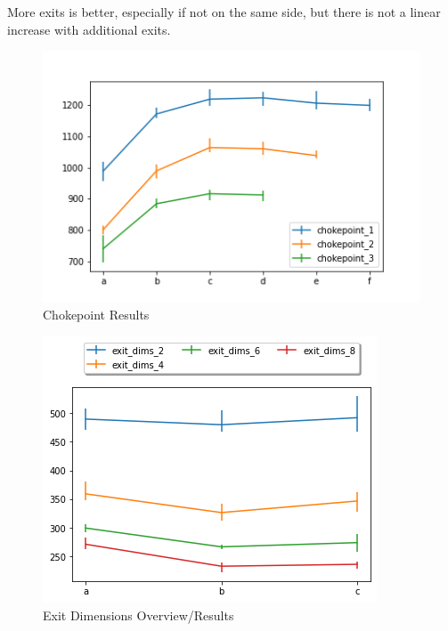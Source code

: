 \documentclass[12pt,letterpaper]{article}
\begin{document}
More exits is better, especially if not on the same side, but there is not a
linear increase with additional exits.

\begin{figure}
  \centering
  \includegraphics[width=.9\linewidth]{./figures/chokepoint_graph.png}
  \caption{Chokepoint Results}
\end{figure}
\begin{figure}
  \centering
  \includegraphics[width=.75\linewidth]{./figures/exit_dims_graph.png}
  \caption{Exit Dimensions Overview/Results}
\end{figure}
\end{document}
